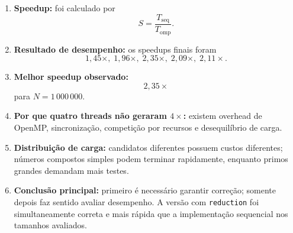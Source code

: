 \begin{enumerate}
    \item \textbf{Speedup:}
    foi calculado por
    \[
    S=\frac{T_{\mathrm{seq}}}{T_{\mathrm{omp}}}.
    \]

    \item \textbf{Resultado de desempenho:}
    os speedups finais foram
    \[
    1,45\times,\;
    1,96\times,\;
    2,35\times,\;
    2,09\times,\;
    2,11\times.
    \]

    \item \textbf{Melhor speedup observado:}
    \[
    2,35\times
    \]
    para \(N=1\,000\,000\).

    \item \textbf{Por que quatro threads não geraram \(4\times\):}
    existem overhead de OpenMP, sincronização, competição por recursos e
    desequilíbrio de carga.

    \item \textbf{Distribuição de carga:}
    candidatos diferentes possuem custos diferentes; números compostos
    simples podem terminar rapidamente, enquanto primos grandes demandam
    mais testes.

    \item \textbf{Conclusão principal:}
    primeiro é necessário garantir correção; somente depois faz sentido
    avaliar desempenho. A versão com \texttt{reduction} foi simultaneamente
    correta e mais rápida que a implementação sequencial nos tamanhos
    avaliados.
\end{enumerate}
